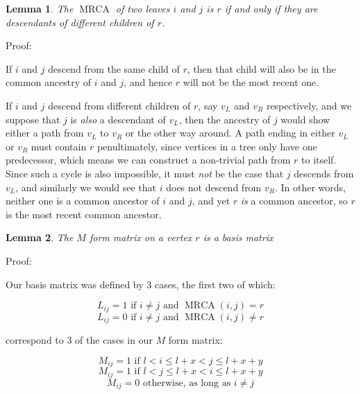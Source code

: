 \documentclass[10pt,a4paper]{report}
\DeclareMathOperator{\MRCA}{MRCA}
\newtheorem{lemma}{Lemma}
\begin{document}
\begin{lemma} The $\MRCA$ of two leaves $i$ and $j$ is $r$ if and only if they are descendants of different children of $r$.
\end{lemma}

Proof:

If $i$ and $j$ descend from the same child of $r$, then that child will also be in the common ancestry of $i$ and $j$, and hence $r$ will not be the most recent one.

If $i$ and $j$ descend from different children of $r$, say $v_L$ and $v_R$ respectively, and we suppose that $j$ is \emph{also} a descendant of $v_L$, then the ancestry of $j$ would show either a path from $v_L$ to $v_R$ or the other way around.
A path ending in either $v_L$ or $v_R$ must contain $r$ penultimately, since vertices in a tree only have one predecessor, which means we can construct a non-trivial path from $r$ to itself.
Since such a cycle is also impossible, it must \emph{not} be the case that $j$ descends from $v_L$, and similarly we would see that $i$ does not descend from $v_R$.
In other words, neither one is a common ancestor of $i$ and $j$, and yet $r$ \emph{is} a common ancestor, so $r$ is the most recent common ancestor.

\begin{lemma} The $M$ form matrix on a vertex $r$ is a basis matrix
\end{lemma}

Proof:

Our basis matrix was defined by 3 cases, the first two of which:

\begin{equation} \label{L_eqn_yes}
	L_{ij} = 1 \textrm{ if } i \neq j \textrm{ and } \MRCA(i, j) = r
\end{equation}
\begin{equation} \label{L_eqn_no}
	L_{ij} = 0 \textrm{ if } i \neq j \textrm{ and } \MRCA(i, j) \neq r
\end{equation}

correspond to 3 of the cases in our $M$ form matrix:

\begin{equation} \label{M_eqn_lr}
	M_{ij} = 1 \textrm{ if } l < i \leq l + x < j \leq l + x + y
\end{equation}
\begin{equation} \label{M_eqn_rl}
	M_{ij} = 1 \textrm{ if } l < j \leq l + x < i \leq l + x + y
\end{equation}
\begin{equation} \label{M_eqn_no}
	M_{ij} = 0 \textrm{ otherwise, as long as } i \neq j
\end{equation}
\end{document}
